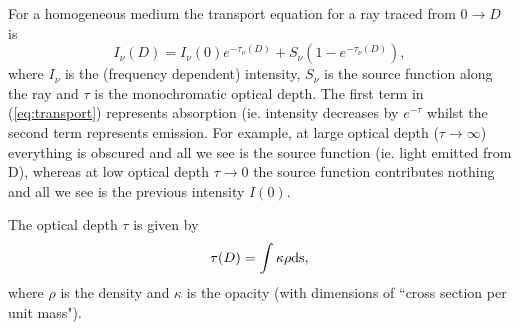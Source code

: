 \documentclass[a4paper,11pt]{article}
\begin{document}
For a homogeneous medium the transport equation for a ray traced from $0\to D$ is
\begin{equation}
I_\nu(D) = I_\nu(0) e^{-\tau_\nu (D)} + S_\nu(1 - e^{-\tau_\nu(D)}),
\label{eq:transport}
\end{equation}
where $I_\nu$ is the (frequency dependent) intensity, $S_\nu$ is the source function along the ray
and $\tau$ is the monochromatic optical depth. The first term in (\ref{eq:transport}) represents absorption (ie.
intensity decreases by $e^{-\tau}$ whilst the second term represents emission. For example, at large
optical depth ($\tau\to\infty$) everything is obscured and all we see is the source function (ie.
light emitted from D), whereas at low optical depth $\tau\to 0$ the source function contributes
nothing and all we see is the previous intensity $I(0)$.

The optical depth $\tau$ is given by
\begin{equation}
\tau(D) = \int \kappa \rho {\rm ds},
\end{equation}
where $\rho$ is the density and $\kappa$ is the opacity (with dimensions of ``cross section per unit
mass").
\end{document}
